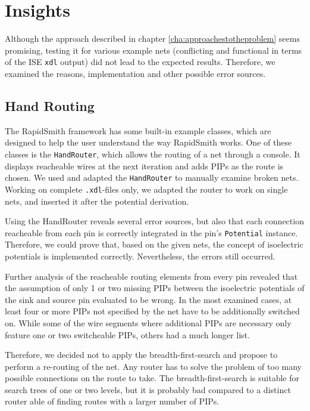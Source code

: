 \chapter{Insights}
\label{cha:insights}

Although the approach described in chapter \ref{cha:approachestotheproblem} seems promising, testing it for various example nets (conflicting and functional in terms of the ISE \texttt{xdl} output) did not lead to the expected results. Therefore, we examined the reasons, implementation and other possible error sources.

\section{Hand Routing}
\label{sec:handrouting}

The RapidSmith framework has some built-in example classes, which are designed to help the user understand the way RapidSmith works. One of these classes is the \texttt{HandRouter}, which allows the routing of a net through a console. It displays reacheable wires at the next iteration and adds PIPs as the route is chosen. We used and adapted the \texttt{HandRouter} to manually examine broken nets. Working on complete \texttt{.xdl}-files only, we adapted the router to work on single nets, and inserted it after the potential derivation.

Using the HandRouter reveals several error sources, but also that each connection reacheable from each pin is correctly integrated in the pin's \texttt{Potential} instance. Therefore, we could prove that, based on the given nets, the concept of isoelectric potentials is implemented correctly. Nevertheless, the errors still occurred.

Further analysis of the reacheable routing elements from every pin revealed that the assumption of only 1 or two missing PIPs between the isoelectric potentials of the sink and source pin evaluated to be wrong. In the most examined cases, at least four or more PIPs not specified by the net have to be additionally switched on. While some of the wire segments where additional PIPs are necessary only feature one or two switcheable PIPs, others had a much longer list. 

Therefore, we decided not to apply the breadth-first-search and propose to perform a re-routing of the net. Any router has to solve the problem of too many possible connections on the route to take. The breadth-first-search is suitable for search trees of one or two levels, but it is probably bad compared to a distinct router able of finding routes with a larger number of PIPs.


